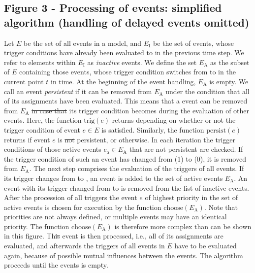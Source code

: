 \documentclass[10pt]{bmc_article}
\newenvironment{bmcformat}{\fussy\setboolean{publ}{true}}{\fussy}
\begin{document}
\begin{bmcformat}
{\subsection*{Figure 3 - Processing of events: simplified algorithm (handling of delayed events omitted)}
Let $E$ be the set of all events in a model, and $E_\mathrm{I}$ be the set of events, whose trigger
conditions have already been evaluated to \true in the previous time step. We refer to elements within
$E_\mathrm{I}$ as \emph{inactive} events. We define the set $E_\mathrm{A}$ as the subset of $E$ containing those events,
whose trigger condition switches from \false to \true in the current point $t$ in time. At the beginning
of the event handling, $E_\mathrm{A}$ is empty. We call an event \emph{persistent}\COR{,} if it can  be removed from $E_\mathrm{A}$ under the condition that all of its assignments have been evaluated. This means that a
 event can be removed from $E_\mathrm{A}$ \sout{in case that} its trigger condition becomes \false during the evaluation of other events. Here, the function $\mathrm{trig}(e)$ returns  depending on whether or not the trigger condition of event $e \in E$ is satisfied. Similarly, the function
$\mathrm{persist}(e)$ returns  if event $e$ is \sout{not} persistent, or  otherwise.
In each iteration the trigger conditions of those active events $e_\mathrm{a} \in E_\mathrm{A}$ that are not persistent are checked.
If the trigger condition of such an event has changed from \true (1) to \false (0), it is removed from $E_\mathrm{A}$.
The next step comprises the evaluation of the triggers of all events.
If its trigger changes from \false to \true, an event is added to the set of active events $E_\mathrm{A}$.
An event with its trigger changed from \true to \false is removed from the list of inactive events.
After the procession of all triggers the event $e$ of highest priority in the set of active events is chosen for execution by the function $\mathrm{choose}(E_\mathrm{A})$.
Note that priorities are not always defined, or multiple events may have an identical priority. The function $\mathrm{choose}(E_\mathrm{A})$ is therefore more complex than can be shown in this figure.
Th\sout{is} event is then processed, i.e., all of its assignments are evaluated, and afterwards the triggers of all events in $E$ have to be evaluated again, because of possible mutual influences between the events.
The algorithm proceeds until the  events is empty.

}
\end{bmcformat}
\end{document}
